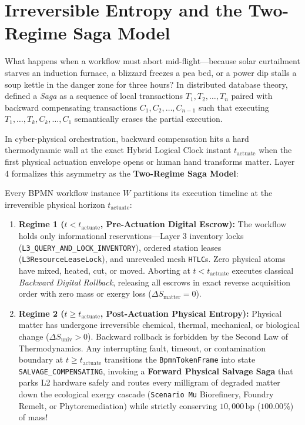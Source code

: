 \section{Irreversible Entropy and the Two-Regime Saga Model}
\label{sec:two-regime-salvage-sagas}

What happens when a workflow must abort mid-flight---because solar curtailment starves an
induction furnace, a blizzard freezes a pea bed, or a power dip stalls a soup kettle in the
danger zone for three hours? In distributed database theory, \textcite{garciamolina1987sagas}
defined a \emph{Saga} as a sequence of local transactions $T_1, T_2, \dots, T_n$ paired with
backward compensating transactions $C_1, C_2, \dots, C_{n-1}$ such that executing
$T_1, \dots, T_k, C_k, \dots, C_1$ semantically erases the partial execution.

In cyber-physical orchestration, backward compensation hits a hard thermodynamic wall at the
exact Hybrid Logical Clock instant $t_{\mathrm{actuate}}$ when the first physical actuation
envelope opens or human hand transforms matter. Layer 4 formalizes this asymmetry as the
\textbf{Two-Regime Saga Model}:

\begin{definition}
\label{def:two-regime-saga}
Every BPMN workflow instance $W$ partitions its execution timeline at the irreversible physical
horizon $t_{\mathrm{actuate}}$:
\begin{enumerate}
    \item \textbf{Regime 1 ($t < t_{\mathrm{actuate}}$, Pre-Actuation Digital Escrow):} The
    workflow holds only informational reservations---Layer 3 inventory locks
    (\texttt{L3\_QUERY\_AND\_LOCK\_INVENTORY}), ordered station leases
    (\texttt{L3ResourceLeaseLock}), and unrevealed mesh \texttt{HTLC}s. Zero physical atoms have
    mixed, heated, cut, or moved. Aborting at $t < t_{\mathrm{actuate}}$ executes classical
    \emph{Backward Digital Rollback}, releasing all escrows in exact reverse acquisition order
    with zero mass or exergy loss ($\Delta S_{\mathrm{matter}} = 0$).
    \item \textbf{Regime 2 ($t \ge t_{\mathrm{actuate}}$, Post-Actuation Physical Entropy):}
    Physical matter has undergone irreversible chemical, thermal, mechanical, or biological
    change ($\Delta S_{\mathrm{univ}} > 0$). Backward rollback is forbidden by the Second Law of
    Thermodynamics. Any interrupting fault, timeout, or contamination boundary at
    $t \ge t_{\mathrm{actuate}}$ transitions the \texttt{BpmnTokenFrame} into state
    \texttt{SALVAGE\_COMPENSATING}, invoking a \textbf{Forward Physical Salvage Saga} that parks
    L2 hardware safely and routes every milligram of degraded matter down the ecological exergy
    cascade (\texttt{Scenario Mu} Biorefinery, Foundry Remelt, or Phytoremediation) while
    strictly conserving $10{,}000\,\mathrm{bp}$ ($100.00\%$) of mass!
\end{enumerate}
\end{definition}

